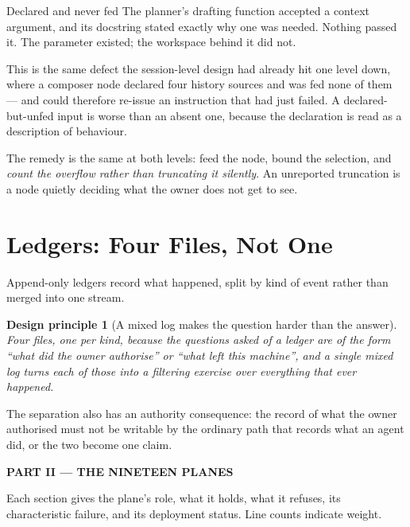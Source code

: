 \documentclass[11pt]{article}
\newtheorem{principle}{Design principle}
\begin{document}
\begin{cautionbox}{Declared and never fed}
The planner's drafting function accepted a context argument, and its docstring stated exactly why one was needed. Nothing passed it. The parameter existed; the workspace behind it did not.

This is the same defect the session-level design had already hit one level down, where a composer node declared four history sources and was fed none of them --- and could therefore re-issue an instruction that had just failed. A declared-but-unfed input is worse than an absent one, because the declaration is read as a description of behaviour.
\end{cautionbox}

The remedy is the same at both levels: feed the node, bound the selection, and \emph{count the overflow rather than truncating it silently}. An unreported truncation is a node quietly deciding what the owner does not get to see.

\section{Ledgers: Four Files, Not One}
\label{sec:ledgers}

Append-only ledgers record what happened, split by kind of event rather than merged into one stream.

\begin{principle}[A mixed log makes the question harder than the answer]
\label{prin:ledger}
Four files, one per kind, because the questions asked of a ledger are of the form \emph{``what did the owner authorise''} or \emph{``what left this machine''}, and a single mixed log turns each of those into a filtering exercise over everything that ever happened.
\end{principle}

The separation also has an authority consequence: the record of what the owner authorised must not be writable by the ordinary path that records what an agent did, or the two become one claim.

\newpage
\begin{center}\large\bfseries PART II --- THE NINETEEN PLANES\end{center}

\noindent Each section gives the plane's role, what it holds, what it refuses, its characteristic failure, and its deployment status. Line counts indicate weight.
\end{document}

